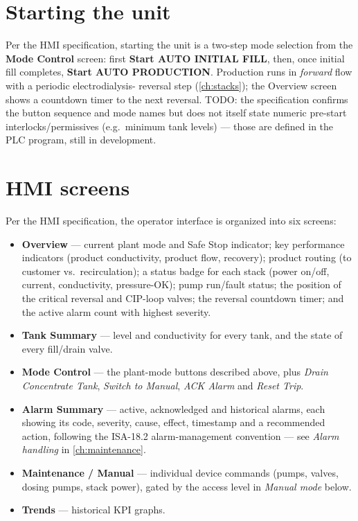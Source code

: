 \documentclass[a4paper,11pt,twoside,openright,numbers=noenddot]{scrreprt}
\begin{document}
\section{Starting the unit}
Per the HMI specification, starting the unit is a two-step mode selection
from the \textbf{Mode Control} screen: first \textbf{Start AUTO INITIAL
FILL}, then, once initial fill completes, \textbf{Start AUTO PRODUCTION}.
Production runs in \emph{forward} flow with a periodic electrodialysis-
reversal step (\cref{ch:stacks}); the Overview screen shows a countdown
timer to the next reversal. TODO: the specification confirms the button
sequence and mode names but does not itself state numeric pre-start
interlocks/permissives (e.g.\ minimum tank levels) --- those are defined
in the PLC program, still in development.

\section{HMI screens}
\label{sec:hmiscreens}
Per the HMI specification, the operator interface is organized into six
screens:
\begin{itemize}
\item \textbf{Overview} --- current plant mode and Safe Stop indicator;
  key performance indicators (product conductivity, product flow,
  recovery); product routing (to customer vs.\ recirculation); a status
  badge for each stack (power on/off, current, conductivity,
  pressure-OK); pump run/fault status; the position of the critical
  reversal and CIP-loop valves; the reversal countdown timer; and the
  active alarm count with highest severity.
\item \textbf{Tank Summary} --- level and conductivity for every tank,
  and the state of every fill/drain valve.
\item \textbf{Mode Control} --- the plant-mode buttons described above,
  plus \emph{Drain Concentrate Tank}, \emph{Switch to Manual}, \emph{ACK
  Alarm} and \emph{Reset Trip}.
\item \textbf{Alarm Summary} --- active, acknowledged and historical
  alarms, each showing its code, severity, cause, effect, timestamp and a
  recommended action, following the ISA-18.2 alarm-management convention
  --- see \emph{Alarm handling} in \cref{ch:maintenance}.
\item \textbf{Maintenance / Manual} --- individual device commands
  (pumps, valves, dosing pumps, stack power), gated by the access level
  in \emph{Manual mode} below.
\item \textbf{Trends} --- historical KPI graphs.
\end{itemize}
\end{document}
